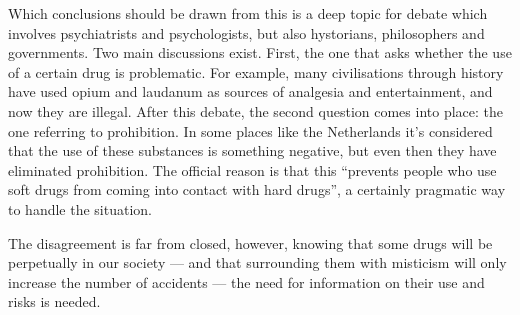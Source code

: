 Which conclusions should be drawn from this is a deep topic for debate which involves psychiatrists and psychologists, but also hystorians, philosophers and governments. Two main discussions exist. First, the one that asks whether the use of a certain drug is problematic. For example, many civilisations through history have used opium and laudanum as sources of analgesia and entertainment, and now they are illegal. After this debate, the second question comes into place: the one referring to prohibition. In some places like the Netherlands it's considered that the use of these substances is something negative, but even then they have eliminated prohibition. The official reason is that this \enquote{prevents people who use soft drugs from coming into contact with hard drugs}, a certainly pragmatic way to handle the situation.

The disagreement is far from closed, however, knowing that some drugs will be perpetually in our society --- and that surrounding them with misticism will only increase the number of accidents --- the need for information on their use and risks is needed.
